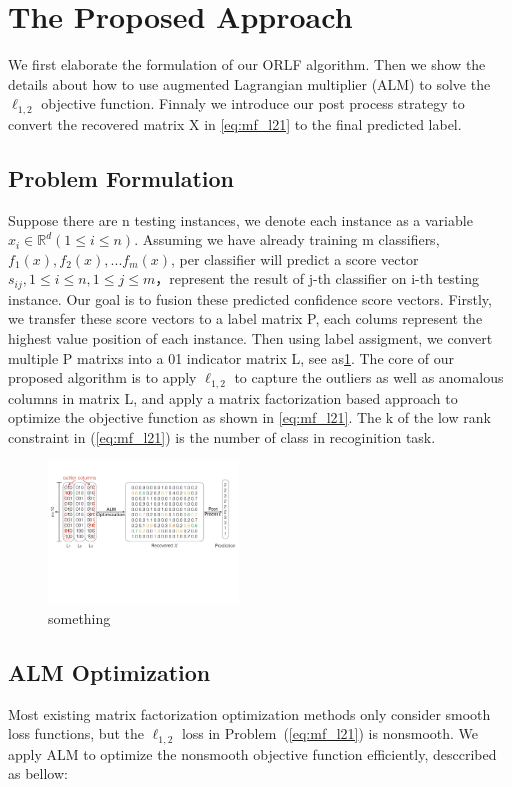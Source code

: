\documentclass[letterpaper]{article}
\def\dsR{\mathds{R}}
\begin{document}

\section{The Proposed Approach}
We first elaborate the formulation of our ORLF algorithm. Then we show the details about how to use augmented Lagrangian multiplier (ALM) to solve the $\ell_{1,2}$ objective function. Finnaly we introduce our post process strategy to convert the recovered matrix X in \ref{eq:mf_l21} to the final predicted label.


\subsection{Problem Formulation}
Suppose there are n testing instances, we denote each instance as a variable $x_i{\in}\dsR^{d}(1{\leq}i{\leq}n)$. Assuming we have already training m classifiers, $f_1(x), f_2(x), ... f_m(x)$, per classifier will predict a score vector $s_{ij}, 1{\leq}i{\leq}n, 1{\leq}j{\leq}m $，represent the result of j-th classifier on i-th testing instance. Our goal is to fusion these predicted confidence score vectors. Firstly, we transfer these score vectors to a label matrix P, each colums represent the highest value position of each instance. Then using label assigment, we convert multiple P matrixs into a 01 indicator matrix L, see as{\ref{fig:framework}}.
The core of our proposed algorithm is to apply $\ell_{1,2}$ to capture the outliers as well as anomalous columns in matrix L, and apply a matrix factorization based approach to optimize the objective function as shown in \ref{eq:mf_l21}. The k of the low rank constraint in (\ref{eq:mf_l21}) is the number of class in recoginition task.

\begin{figure}[h]
\centering\includegraphics[width=0.45\textwidth]{resource/frame_work.pdf}
\caption{something}\label{fig:framework}
\end{figure}


\subsection{ALM Optimization}
Most existing matrix factorization optimization methods only consider smooth loss functions, but the $\ell_{1,2}$ loss in Problem~(\ref{eq:mf_l21}) is nonsmooth.
We apply ALM to optimize the nonsmooth objective function efficiently, desccribed as bellow:
\end{document}
